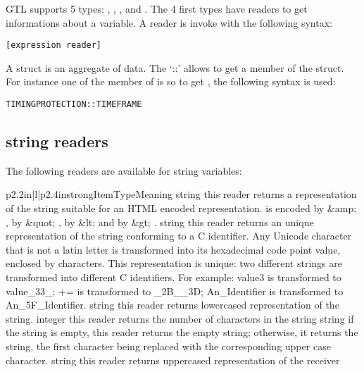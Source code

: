 GTL supports 5 types: , , ,  and . The 4 first types have readers %
to get informations about a variable. A reader is invoke with the following syntax:

\begin{lstlisting}
[expression reader]
\end{lstlisting}

A struct is an aggregate of data. The `::' allows to get a member of the struct. For instance one of the member of  is  so to get , the following syntax is used:

\begin{lstlisting}
TIMINGPROTECTION::TIMEFRAME
\end{lstlisting}

\subsection{string readers}

The following readers are available for string variables:

\begin{longtableiii}{p{2.2in}|l|p{2.4in}}{strong}{Item}{Type}{Meaning}
  {string}
  {this reader returns a representation of the string suitable for an HTML encoded representation. \character{\&} is encoded by \&amp; ,  by \&quot; , \character{<} by \&lt; and \character{>} by \&gt; .}
  {string}
  {this reader returns an unique representation of the string conforming to a C identifier. Any Unicode character that is not a latin letter is transformed into its hexadecimal code point value, enclosed by \character{_} characters. This representation is unique: two different strings are transformed into different C identifiers. For example: value3 is transformed to value\_33\_; += is transformed to \_2B\_\_3D;
An\_Identifier is transformed to An\_5F\_Identifier.}
  {string}
  {this reader returns lowercased representation of the string.}
  {integer}
  {this reader returns the number of characters in the string}
  {string}
  {if the string is empty, this reader returns the empty string; otherwise, it returns the string, the first character being replaced with the corresponding upper case character.}
  {string}
  {this reader returns uppercased representation of the receiver}
\end{longtableiii}

